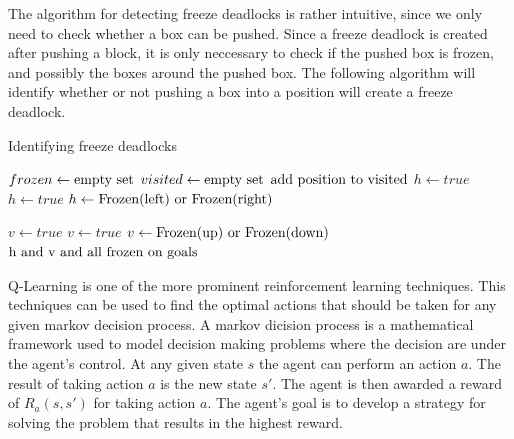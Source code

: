 \documentclass[times, 10pt,twocolumn]{article}
\begin{document}
The algorithm for detecting freeze deadlocks is rather intuitive, since we only need to check whether a box can be pushed. Since a freeze deadlock is created after pushing a block, it is only neccessary to check if the pushed box is frozen, and possibly the boxes around the pushed box. The following algorithm will identify whether or not pushing a box into a position will create a freeze deadlock.

\begin{algorithm}
  \caption{Identifying freeze deadlocks}
\begin{algorithmic}[1]
  \State $frozen \gets \textnormal{empty set}$
  \State $visited \gets \textnormal{empty set}$
    \State $\textnormal{add position to visited}$
      \State $h\gets true$
      \State $h\gets true$
      \State $h\gets \textnormal{Frozen(left) or Frozen(right)}$
    \EndIf

      \State $v\gets true$
      \State $v\gets true$
      \State $v\gets \textnormal{Frozen(up) or Frozen(down)}$
    \EndIf
    \State \Return $\textnormal{h and v and all frozen on goals}$
  \EndFunction
  \end{algorithmic}
\end{algorithm}




Q-Learning is one of the more prominent reinforcement learning techniques. This techniques can be used to find the optimal actions that should be taken for any given markov decision process. A markov dicision process is a mathematical framework used to model decision making problems where the decision are under the agent's control. At any given state $s$ the agent can perform an action $a$. The result of taking action $a$ is the new state $s\prime$. The agent is then awarded a reward of $R_a(s, s\prime)$ for taking action $a$. The agent’s goal is to develop a strategy for solving the problem that results in the highest reward.
\end{document}
